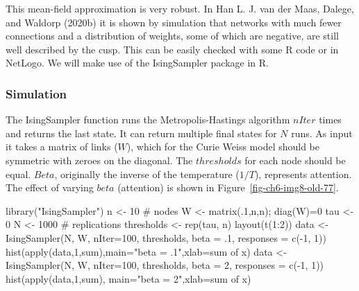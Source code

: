 \documentclass[
  a4paper,
  DIV=11,
  numbers=noendperiod,
  oneside]{scrreprt}
\newenvironment{Shaded}{\begin{snugshade}}{\end{snugshade}}
\newcommand{\AttributeTok}[1]{\textcolor[rgb]{0.40,0.45,0.13}{#1}}
\newcommand{\CommentTok}[1]{\textcolor[rgb]{0.37,0.37,0.37}{#1}}
\newcommand{\DecValTok}[1]{\textcolor[rgb]{0.68,0.00,0.00}{#1}}
\newcommand{\FunctionTok}[1]{\textcolor[rgb]{0.28,0.35,0.67}{#1}}
\newcommand{\NormalTok}[1]{\textcolor[rgb]{0.00,0.23,0.31}{#1}}
\newcommand{\OtherTok}[1]{\textcolor[rgb]{0.00,0.23,0.31}{#1}}
\newcommand{\SpecialCharTok}[1]{\textcolor[rgb]{0.37,0.37,0.37}{#1}}
\newcommand{\StringTok}[1]{\textcolor[rgb]{0.13,0.47,0.30}{#1}}
\begin{document}
This mean-field approximation is very robust. In Han L. J. van der Maas,
Dalege, and Waldorp (2020b) it is shown by simulation that networks with
much fewer connections and a distribution of weights, some of which are
negative, are still well described by the cusp. This can be easily
checked with some R code or in NetLogo. We will make use of the
IsingSampler package in R.

\hypertarget{sec-Simulation}{%
\subsubsection{Simulation}\label{sec-Simulation}}

The IsingSampler function runs the Metropolis-Hastings algorithm
\(nIter\) times and returns the last state. It can return multiple final
states for \(N\) runs. As input it takes a matrix of links (\(W\)),
which for the Curie Weiss model should be symmetric with zeroes on the
diagonal. The \(thresholds\) for each node should be equal. \(Beta\),
originally the inverse of the temperature (\(1/T\)), represents
attention. The effect of varying \(beta\) (attention) is shown in
Figure~\ref{fig-ch6-img8-old-77}.

\begin{Shaded}
\begin{Highlighting}[]
\FunctionTok{library}\NormalTok{(}\StringTok{"IsingSampler"}\NormalTok{)}
\NormalTok{n }\OtherTok{\textless{}{-}} \DecValTok{10} \CommentTok{\# nodes}
\NormalTok{W }\OtherTok{\textless{}{-}} \FunctionTok{matrix}\NormalTok{(.}\DecValTok{1}\NormalTok{,n,n); }\FunctionTok{diag}\NormalTok{(W)}\OtherTok{=}\DecValTok{0}
\NormalTok{tau }\OtherTok{\textless{}{-}} \DecValTok{0}
\NormalTok{N }\OtherTok{\textless{}{-}} \DecValTok{1000} \CommentTok{\# replications}
\NormalTok{thresholds }\OtherTok{\textless{}{-}} \FunctionTok{rep}\NormalTok{(tau, n)}
\FunctionTok{layout}\NormalTok{(}\FunctionTok{t}\NormalTok{(}\DecValTok{1}\SpecialCharTok{:}\DecValTok{2}\NormalTok{))}
\NormalTok{data }\OtherTok{\textless{}{-}} \FunctionTok{IsingSampler}\NormalTok{(N, W, }\AttributeTok{nIter=}\DecValTok{100}\NormalTok{, thresholds, }\AttributeTok{beta =}\NormalTok{ .}\DecValTok{1}\NormalTok{, }\AttributeTok{responses =} \FunctionTok{c}\NormalTok{(}\SpecialCharTok{{-}}\DecValTok{1}\NormalTok{, }\DecValTok{1}\NormalTok{))}
\FunctionTok{hist}\NormalTok{(}\FunctionTok{apply}\NormalTok{(data,}\DecValTok{1}\NormalTok{,sum),}\AttributeTok{main=}\StringTok{"beta = .1"}\NormalTok{,}\AttributeTok{xlab=}\StringTok{\textquotesingle{}sum of x\textquotesingle{}}\NormalTok{)}
\NormalTok{data }\OtherTok{\textless{}{-}} \FunctionTok{IsingSampler}\NormalTok{(N, W, }\AttributeTok{nIter=}\DecValTok{100}\NormalTok{, thresholds, }\AttributeTok{beta =} \DecValTok{2}\NormalTok{, }\AttributeTok{responses =} \FunctionTok{c}\NormalTok{(}\SpecialCharTok{{-}}\DecValTok{1}\NormalTok{, }\DecValTok{1}\NormalTok{))}
\FunctionTok{hist}\NormalTok{(}\FunctionTok{apply}\NormalTok{(data,}\DecValTok{1}\NormalTok{,sum), }\AttributeTok{main=}\StringTok{"beta = 2"}\NormalTok{,}\AttributeTok{xlab=}\StringTok{\textquotesingle{}sum of x\textquotesingle{}}\NormalTok{)}
\end{Highlighting}
\end{Shaded}
\end{document}
